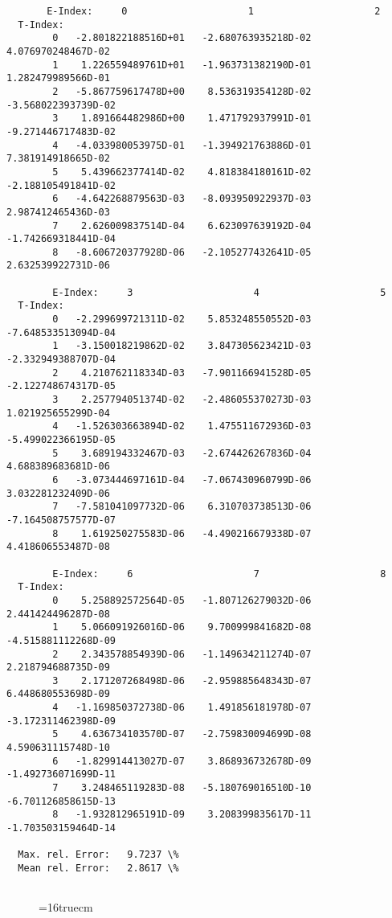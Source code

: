 \documentclass[12pt,dvipdfmx]{article}
\begin{document}
{\begin{small}
\begin{verbatim}
       E-Index:     0                     1                     2
  T-Index:
        0   -2.801822188516D+01   -2.680763935218D-02    4.076970248467D-02
        1    1.226559489761D+01   -1.963731382190D-01    1.282479989566D-01
        2   -5.867759617478D+00    8.536319354128D-02   -3.568022393739D-02
        3    1.891664482986D+00    1.471792937991D-01   -9.271446717483D-02
        4   -4.033980053975D-01   -1.394921763886D-01    7.381914918665D-02
        5    5.439662377414D-02    4.818384180161D-02   -2.188105491841D-02
        6   -4.642268879563D-03   -8.093950922937D-03    2.987412465436D-03
        7    2.626009837514D-04    6.623097639192D-04   -1.742669318441D-04
        8   -8.606720377928D-06   -2.105277432641D-05    2.632539922731D-06

        E-Index:     3                     4                     5
  T-Index:
        0   -2.299699721311D-02    5.853248550552D-03   -7.648533513094D-04
        1   -3.150018219862D-02    3.847305623421D-03   -2.332949388707D-04
        2    4.210762118334D-03   -7.901166941528D-05   -2.122748674317D-05
        3    2.257794051374D-02   -2.486055370273D-03    1.021925655299D-04
        4   -1.526303663894D-02    1.475511672936D-03   -5.499022366195D-05
        5    3.689194332467D-03   -2.674426267836D-04    4.688389683681D-06
        6   -3.073444697161D-04   -7.067430960799D-06    3.032281232409D-06
        7   -7.581041097732D-06    6.310703738513D-06   -7.164508757577D-07
        8    1.619250275583D-06   -4.490216679338D-07    4.418606553487D-08

        E-Index:     6                     7                     8
  T-Index:
        0    5.258892572564D-05   -1.807126279032D-06    2.441424496287D-08
        1    5.066091926016D-06    9.700999841682D-08   -4.515881112268D-09
        2    2.343578854939D-06   -1.149634211274D-07    2.218794688735D-09
        3    2.171207268498D-06   -2.959885648343D-07    6.448680553698D-09
        4   -1.169850372738D-06    1.491856181978D-07   -3.172311462398D-09
        5    4.636734103570D-07   -2.759830094699D-08    4.590631115748D-10
        6   -1.829914413027D-07    3.868936732678D-09   -1.492736071699D-11
        7    3.248465119283D-08   -5.180769016510D-10   -6.701126858615D-13
        8   -1.932812965191D-09    3.208399835617D-11   -1.703503159464D-14

  Max. rel. Error:   9.7237 \%
  Mean rel. Error:   2.8617 \%


\end{verbatim}\end{small}
\begin{figure} \label{2.2.h2r}
\epsfxsize=16truecm
\end{figure}
\newpage

}
\end{document}
